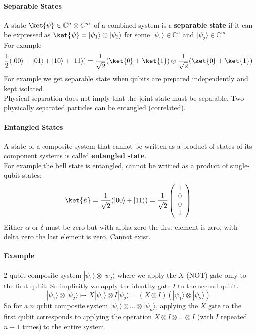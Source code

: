\documentclass[10pt]{report}
\begin{document}
\paragraph{Separable States} A state $\ket{\psi}\in \mathbb{C}^n\otimes C^m$ of a combined system is a \textbf{separable state} if it can be expressed as $\ket{\psi} = |\psi_1\rangle\otimes|\psi_2\rangle$ for some $|\psi_1\rangle\in \mathbb{C}^n$ and $|\psi_2\rangle\in \mathbb{C}^m$\\
For example $$\frac{1}{2}(|00\rangle+|01\rangle+|10\rangle+|11\rangle) = \frac{1}{\sqrt{2}}(\ket{0} + \ket{1})\otimes \frac{1}{\sqrt{2}}(\ket{0}+\ket{1})$$
For example we get separable state when qubits are prepared independently and kept isolated.\\
Physical separation does not imply that the joint state must be separable. Two physically separated particles can be entangled (correlated).
\paragraph{Entangled States} A state of a composite system that cannot be written as a product of states of its component systems is called \textbf{entangled state}.\\
For example the bell state is entangled, cannot be writted as a product of single-qubit states:
$$\ket{\psi}=\frac{1}{\sqrt{2}}(|00\rangle+|11\rangle) = \frac{1}{\sqrt{2}}\left(\begin{array}{c}
1\\0\\0\\1
\end{array}\right)$$
Either $\alpha$ or $\delta$ must be zero but with alpha zero the first element is zero, with delta zero the last element is zero. Cannot exist.
\paragraph{Example} 2 qubit composite system $|\psi_1\rangle\otimes|\psi_2\rangle$ where we apply the $X$ (NOT) gate only to the first qubit. So implicitly we apply the identity gate $I$ to the second qubit.
$$|\psi_1\rangle\otimes|\psi_2\rangle\mapsto X|\psi_1\rangle\otimes I|\psi_2\rangle = (X\otimes I)(|\psi_1\rangle\otimes|\psi_2\rangle)$$
So for a $n$ qubit composite system $|\psi_1\rangle\otimes\ldots\otimes|\psi_n\rangle$, applying the $X$ gate to the first qubit corresponds to applying the operation $X\otimes I\otimes\ldots\otimes I$ (with $I$ repeated $n-1$ times) to the entire system.
\end{document}
